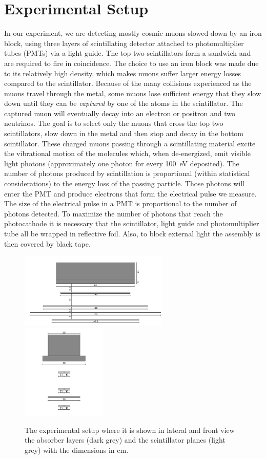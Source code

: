 \chapter{Experimental Setup}
\label{sec:setup}
In our experiment, we are detecting mostly cosmic muons slowed down by an iron block, 
using three layers of scintillating detector attached to photomultiplier tubes (PMTs)
via a light guide. The top two scintillators form a sandwich and are required to fire in
coincidence. The choice to use an iron block was made due to its relatively high density,
which makes muons suffer larger energy losses compared to the scintillator.
Because of the many collisions experienced as the muons travel through the metal,
some muons lose sufficient energy that they slow down until they can be \textit{captured}
by one of the atoms in the scintillator. 
The captured muon will eventually decay into an electron or positron and two neutrinos.
The goal is to select only the muons that cross the top two scintillators, 
slow down in the metal and then stop and decay in the bottom scintillator.
These charged muons passing through a scintillating material excite the vibrational motion 
of the molecules which, when de-energized, emit visible light photons (approximately one photon
for every \SI{100}{eV} deposited). The number of photons produced by scintillation 
is proportional (within statistical considerations) to the energy loss of the passing particle.
Those photons will enter the PMT and produce electrons that form the electrical pulse we measure.
The size of the electrical pulse in a PMT is proportional to the number of photons detected.
To maximize the number of photons that reach the photocathode it is necessary that the scintillator,
light guide and photomultiplier tube all be wrapped in reflective foil. Also, to block external 
light the assembly is then covered by black tape.
	\begin{figure}
		\centering
		\includegraphics[width=0.63\textwidth]{figures/11.png}
		\includegraphics[width=0.36\textwidth]{figures/22.png}
		\caption{The experimental setup where it is shown in lateral and front view the absorber layers (dark grey) and the scintillator planes (light grey) with the dimensions in cm.}
		\label{fig:Scintillators_Detectors}
	\end{figure}
